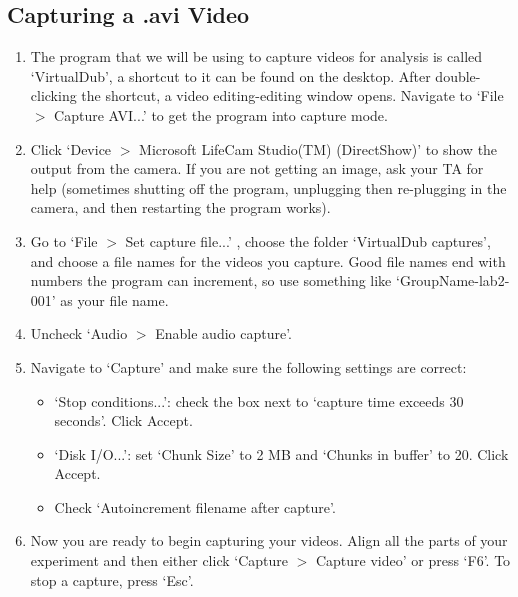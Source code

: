 \subsection{Capturing a .avi Video}
\begin{enumerate}
\item The program that we will be using to capture videos for analysis is called `VirtualDub', a shortcut to it can be found on the desktop. After double-clicking the shortcut, a video editing-editing window opens. Navigate to `File $>$ Capture AVI...' to get the program into capture mode.
\item Click `Device $>$ Microsoft LifeCam Studio(TM) (DirectShow)' to show the output from the camera. If you are not getting an image, ask your TA for help (sometimes shutting off the program, unplugging then re-plugging in the camera, and then restarting the program works).
\item Go to `File $>$ Set capture file...' , choose the folder `VirtualDub captures', and choose a file names for the videos you capture. Good file names end with numbers the program can increment, so use something like `GroupName-lab2-001' as your file name.
\item Uncheck `Audio $>$ Enable audio capture'.
\item Navigate to `Capture' and make sure the following settings are correct:
\begin{itemize}
	\item `Stop conditions...': check the box next to `capture time exceeds 30 seconds'. Click Accept.
	\item `Disk I/O...': set `Chunk Size' to 2 MB and `Chunks in buffer' to 20. Click Accept.
	\item Check `Autoincrement filename after capture'.
\end{itemize}
\item Now you are ready to begin capturing your videos. Align all the parts of your experiment and then either click `Capture $>$ Capture video' or press `F6'. To stop a capture, press `Esc'.
\end{enumerate}

